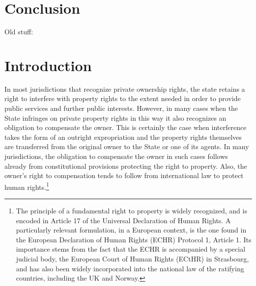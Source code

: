 \section{Conclusion}

Old stuff:

\section{Introduction}\label{intro}

In most jurisdictions that recognize private ownership rights, the state retains a right to interfere with property rights to the extent needed in order to provide public services and further public interests. However, in many cases when the State infringes on private property rights in this way it also recognizes an obligation to compensate the owner. This is certainly the case when interference takes the form of an outright expropriation and the property rights themselves are transferred from the original owner to the State or one of its agents. In many jurisdictions, the obligation to compensate the owner in such cases follows already from constitutional provisions protecting the right to property. Also, the owner's right to compensation tends to follow from international law to protect human rights.\footnote{The principle of a fundamental right to property is widely recognized, and is encoded in Article 17 of the Universal Declaration of Human Rights. A particularly relevant formulation, in a European context, is the one found in the European Declaration of Human Rights (ECHR) Protocol 1, Article 1. Its importance stems from the fact that the ECHR is accompanied by a special judicial body, the European Court of Human Rights (ECtHR) in Strasbourg, and has also been widely incorporated into the national law of the ratifying countries, including the UK and Norway.} 

